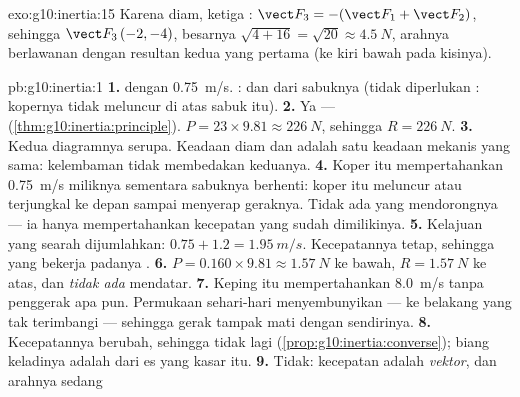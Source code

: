 \begin{solution}{exo:g10:inertia:15}
Karena diam, ketiga  :
$\vect F_3 = -(\vect F_1 + \vect F_2)$, sehingga $\vect F_3\,(-2, -4)$,
besarnya $\sqrt{4 + 16} = \sqrt{20} \approx \qty{4.5}{N}$, arahnya
berlawanan dengan resultan kedua  yang pertama (ke kiri bawah pada
kisinya).
\end{solution}

\begin{solution}{pb:g10:inertia:1}
\textbf{1.}  dengan \qty{0.75}{m/s}. :
 dan  dari sabuknya (tidak diperlukan : kopernya
tidak meluncur di atas sabuk itu).
\textbf{2.} Ya --- 
(\cref{thm:g10:inertia:principle}). $P = 23 \times 9.81 \approx
\qty{226}{N}$, sehingga $R = \qty{226}{N}$.
\textbf{3.} Kedua diagramnya serupa. Keadaan diam dan  adalah satu keadaan mekanis yang sama: kelembaman tidak
membedakan keduanya.
\textbf{4.} Koper itu mempertahankan \qty{0.75}{m/s} miliknya sementara
sabuknya berhenti: koper itu meluncur atau terjungkal ke depan sampai
 menyerap geraknya. Tidak ada yang mendorongnya --- ia hanya
mempertahankan kecepatan yang sudah dimilikinya.
\textbf{5.} Kelajuan yang searah dijumlahkan: $0.75 + 1.2 =
\qty{1.95}{m/s}$. Kecepatannya tetap, sehingga  yang bekerja
padanya .
\textbf{6.} $P = 0.160 \times 9.81 \approx \qty{1.57}{N}$ ke bawah,
$R = \qty{1.57}{N}$ ke atas, dan \emph{tidak ada}  mendatar.
\textbf{7.} Keping itu mempertahankan \qty{8.0}{m/s} tanpa penggerak
apa pun. Permukaan sehari-hari menyembunyikan  ---  ke
belakang yang tak terimbangi --- sehingga gerak tampak mati dengan
sendirinya.
\textbf{8.} Kecepatannya berubah, sehingga  tidak lagi  (\cref{prop:g10:inertia:converse}); biang keladinya adalah
 dari es yang kasar itu.
\textbf{9.} Tidak: kecepatan adalah \emph{vektor}, dan arahnya sedang

\end{solution}
